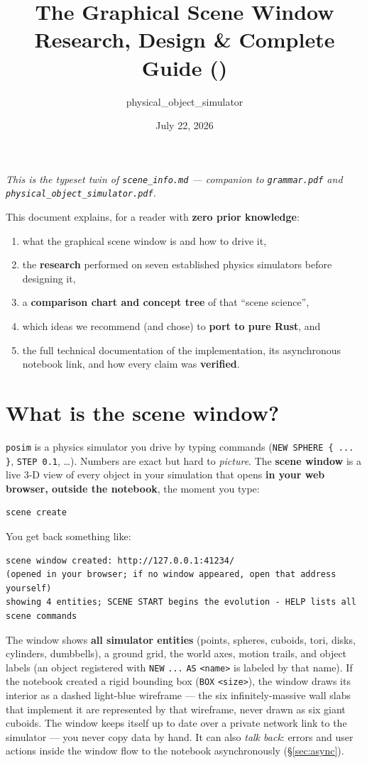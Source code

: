 \documentclass[11pt]{article}
\title{The \code{posim} Graphical Scene Window\\[2pt]
       \large Research, Design \& Complete Guide (\code{scene\_info})}
\author{physical\_object\_simulator}
\date{July 22, 2026}
\newcommand{\kw}[1]{\texttt{\uppercase{#1}}}
\newcommand{\code}[1]{\texttt{#1}}
\begin{document}
\maketitle

\noindent\emph{This is the typeset twin of \code{scene\_info.md} ---
companion to \code{grammar.pdf} and
\code{physical\_object\_simulator.pdf}.}

This document explains, for a reader with \textbf{zero prior knowledge}:
\begin{enumerate}
\item what the graphical scene window is and how to drive it,
\item the \textbf{research} performed on seven established physics
      simulators before designing it,
\item a \textbf{comparison chart and concept tree} of that ``scene
      science'',
\item which ideas we recommend (and chose) to \textbf{port to pure
      Rust}, and
\item the full technical documentation of the implementation, its
      asynchronous notebook link, and how every claim was
      \textbf{verified}.
\end{enumerate}

\tableofcontents

\section{What is the scene window?}

\code{posim} is a physics simulator you drive by typing commands
(\code{NEW SPHERE \{ ... \}}, \code{STEP 0.1}, \ldots). Numbers are
exact but hard to \emph{picture}. The \textbf{scene window} is a live
3-D view of every object in your simulation that opens \textbf{in your
web browser, outside the notebook}, the moment you type:

\begin{lstlisting}
scene create
\end{lstlisting}

You get back something like:

\begin{lstlisting}
scene window created: http://127.0.0.1:41234/
(opened in your browser; if no window appeared, open that address yourself)
showing 4 entities; SCENE START begins the evolution - HELP lists all scene commands
\end{lstlisting}

The window shows \textbf{all simulator entities} (points, spheres,
cuboids, tori, disks, cylinders, dumbbells), a ground grid, the world
axes, motion trails, and object labels (an object registered with
\kw{new} \code{...} \kw{as} \code{<name>} is labeled by that name).
If the notebook created a rigid
bounding box (\kw{box} \code{<size>}), the window draws its interior
as a dashed light-blue wireframe --- the six infinitely-massive wall
slabs that implement it are represented by that wireframe, never
drawn as six giant cuboids. The window keeps itself up to date over a
private network link to the simulator --- you never copy data by
hand. It can also \emph{talk back}: errors and user actions inside
the window flow to the notebook asynchronously (\S\ref{sec:async}).
\end{document}
